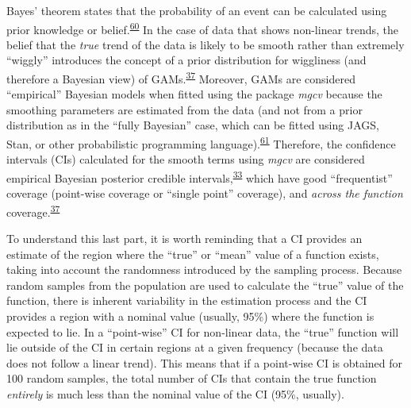 \documentclass[
]{article}
\begin{document}
Bayes' theorem states that the probability of an event can be calculated using prior knowledge or belief.\textsuperscript{\protect\hyperlink{ref-mcelreath2018}{60}} In the case of data that shows non-linear trends, the belief that the \emph{true} trend of the data is likely to be smooth rather than extremely ``wiggly'' introduces the concept of a prior distribution for wiggliness (and therefore a Bayesian view) of GAMs.\textsuperscript{\protect\hyperlink{ref-wood2017}{37}} Moreover, GAMs are considered ``empirical'' Bayesian models when fitted using the package \emph{mgcv} because the smoothing parameters are estimated from the data (and not from a prior distribution as in the ``fully Bayesian'' case, which can be fitted using JAGS, Stan, or other probabilistic programming language).\textsuperscript{\protect\hyperlink{ref-miller2019}{61}} Therefore, the confidence intervals (CIs) calculated for the smooth terms using \emph{mgcv} are considered empirical Bayesian posterior credible intervals,\textsuperscript{\protect\hyperlink{ref-pedersen2019}{33}} which have good ``frequentist'' coverage (point-wise coverage or ``single point'' coverage), and \emph{across the function} coverage.\textsuperscript{\protect\hyperlink{ref-wood2017}{37}}

To understand this last part, it is worth reminding that a CI provides an estimate of the region where the ``true'' or ``mean'' value of a function exists, taking into account the randomness introduced by the sampling process. Because random samples from the population are used to calculate the ``true'' value of the function, there is inherent variability in the estimation process and the CI provides a region with a nominal value (usually, 95\%) where the function is expected to lie. In a ``point-wise'' CI for non-linear data, the ``true'' function will lie outside of the CI in certain regions at a given frequency (because the data does not follow a linear trend). This means that if a point-wise CI is obtained for 100 random samples, the total number of CIs that contain the true function \emph{entirely} is much less than the nominal value of the CI (95\%, usually).
\end{document}
